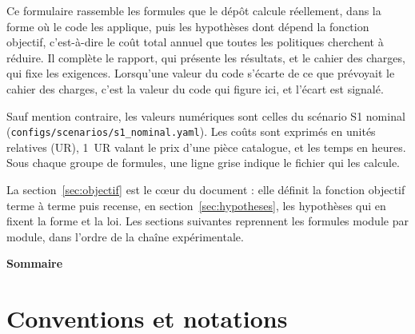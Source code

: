 \documentclass[11pt,a4paper]{article}
\numberwithin{equation}{section}
\begin{document}
Ce formulaire rassemble les formules que le dépôt calcule réellement, dans la forme où le code les applique, puis les hypothèses dont dépend la fonction objectif, c'est-à-dire le coût total annuel que toutes les politiques cherchent à réduire. Il complète le rapport, qui présente les résultats, et le cahier des charges, qui fixe les exigences. Lorsqu'une valeur du code s'écarte de ce que prévoyait le cahier des charges, c'est la valeur du code qui figure ici, et l'écart est signalé.

Sauf mention contraire, les valeurs numériques sont celles du scénario S1 nominal (\nolinkurl{configs/scenarios/s1_nominal.yaml}). Les coûts sont exprimés en unités relatives (UR), 1~UR valant le prix d'une pièce catalogue, et les temps en heures. Sous chaque groupe de formules, une ligne grise indique le fichier qui les calcule.

La section~\ref{sec:objectif} est le cœur du document : elle définit la fonction objectif terme à terme puis recense, en section~\ref{sec:hypotheses}, les hypothèses qui en fixent la forme et la loi. Les sections suivantes reprennent les formules module par module, dans l'ordre de la chaîne expérimentale.

\vspace{1.2em}
{\sffamily\bfseries\color{primaire}Sommaire}\par\vspace{-0.6em}
\makeatletter{}\makeatother

\clearpage

\section{Conventions et notations}\label{sec:notations}
\end{document}
